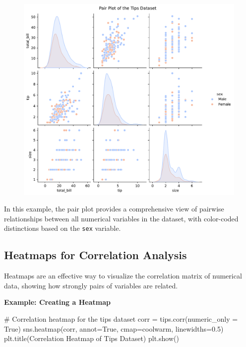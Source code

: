 \documentclass[
  letterpaper,
  DIV=11,
  numbers=noendperiod]{scrreprt}
\newenvironment{Shaded}{\begin{snugshade}}{\end{snugshade}}
\newcommand{\CommentTok}[1]{\textcolor[rgb]{0.37,0.37,0.37}{#1}}
\newcommand{\FloatTok}[1]{\textcolor[rgb]{0.68,0.00,0.00}{#1}}
\newcommand{\NormalTok}[1]{\textcolor[rgb]{0.00,0.23,0.31}{#1}}
\newcommand{\OperatorTok}[1]{\textcolor[rgb]{0.37,0.37,0.37}{#1}}
\newcommand{\StringTok}[1]{\textcolor[rgb]{0.13,0.47,0.30}{#1}}
\newcommand{\VariableTok}[1]{\textcolor[rgb]{0.07,0.07,0.07}{#1}}
\begin{document}
\begin{figure}[H]

{\centering \includegraphics{15_Data_Vis_files/figure-pdf/cell-15-output-1.pdf}

}

\end{figure}

In this example, the pair plot provides a comprehensive view of pairwise
relationships between all numerical variables in the dataset, with
color-coded distinctions based on the \texttt{sex} variable.

\hypertarget{heatmaps-for-correlation-analysis}{%
\subsection{Heatmaps for Correlation
Analysis}\label{heatmaps-for-correlation-analysis}}

Heatmaps are an effective way to visualize the correlation matrix of
numerical data, showing how strongly pairs of variables are related.

\textbf{Example: Creating a Heatmap}

\begin{Shaded}
\begin{Highlighting}[]
\CommentTok{\# Correlation heatmap for the tips dataset}
\NormalTok{corr }\OperatorTok{=}\NormalTok{ tips.corr(numeric\_only }\OperatorTok{=} \VariableTok{True}\NormalTok{)}
\NormalTok{sns.heatmap(corr, annot}\OperatorTok{=}\VariableTok{True}\NormalTok{, cmap}\OperatorTok{=}\StringTok{\textquotesingle{}coolwarm\textquotesingle{}}\NormalTok{, linewidths}\OperatorTok{=}\FloatTok{0.5}\NormalTok{)}
\NormalTok{plt.title(}\StringTok{\textquotesingle{}Correlation Heatmap of Tips Dataset\textquotesingle{}}\NormalTok{)}
\NormalTok{plt.show()}
\end{Highlighting}
\end{Shaded}
\end{document}
